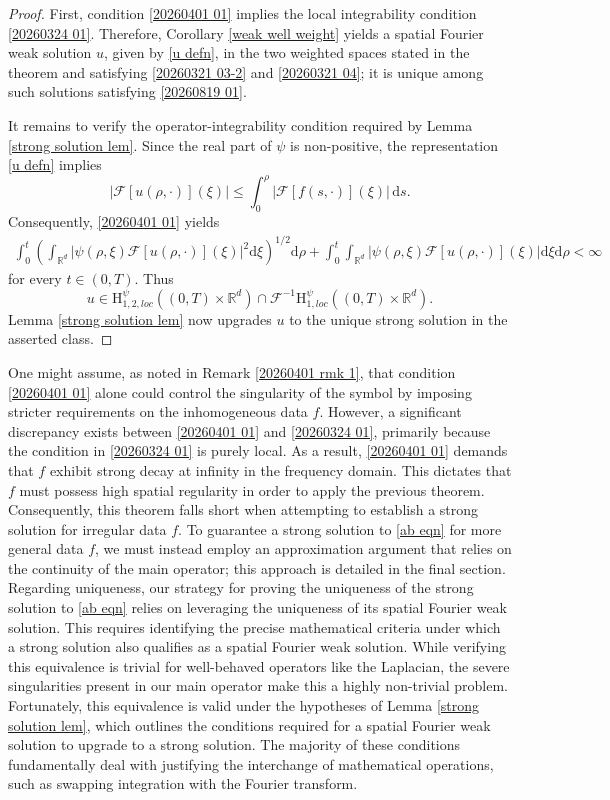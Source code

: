 \documentclass[11pt,reqno]{amsart}
\theoremstyle{definition}
\theoremstyle{remark}
\newcommand\bR{\mathbb{R}}
\newcommand\cF{\mathcal{F}}
\numberwithin{equation}{section}
\begin{document}
\begin{proof}
First, condition \eqref{20260401 01} implies the local integrability condition \eqref{20260324 01}. 
Therefore, Corollary \ref{weak well weight} yields a spatial Fourier weak solution $u$, given by \eqref{u defn}, in the two weighted spaces stated in the theorem and satisfying \eqref{20260321 03-2} and \eqref{20260321 04}; it is unique among such solutions satisfying \eqref{20260819 01}.

It remains to verify the operator-integrability condition required by Lemma \ref{strong solution lem}. Since the real part of $\psi$ is non-positive, the representation \eqref{u defn} implies
\[
|\cF[u(\rho,\cdot)](\xi)|
\leq \int_0^\rho |\cF[f(s,\cdot)](\xi)|\,\mathrm{d}s.
\]
Consequently, \eqref{20260401 01} yields
\begin{align*}
\int_0^t\left(\int_{\bR^d}|\psi(\rho,\xi)\cF[u(\rho,\cdot)](\xi)|^2\mathrm{d}\xi\right)^{1/2}\mathrm{d}\rho
+\int_0^t\int_{\bR^d}|\psi(\rho,\xi)\cF[u(\rho,\cdot)](\xi)|\mathrm{d}\xi\mathrm{d}\rho
<\infty
\end{align*}
for every $t\in(0,T)$. Thus
\[
u\in\mathrm{H}_{1,2,loc}^{\psi}\left( (0,T) \times \bR^d\right) \cap \cF^{-1}\mathrm{H}_{1,loc}^{\psi}\left( (0,T) \times \bR^d\right).
\]
Lemma \ref{strong solution lem} now upgrades $u$ to the unique strong solution in the asserted class.
\end{proof}


One might assume, as noted in Remark \ref{20260401 rmk 1}, that condition \eqref{20260401 01} alone could control the singularity of the symbol by imposing stricter requirements on the inhomogeneous data $f$. 
However, a significant discrepancy exists between \eqref{20260401 01} and \eqref{20260324 01}, primarily because the condition in \eqref{20260324 01} is purely local.
As a result, \eqref{20260401 01} demands that $f$ exhibit strong decay at infinity in the frequency domain. 
This dictates that $f$ must possess high spatial regularity in order to apply the previous theorem. 
Consequently, this theorem falls short when attempting to establish a strong solution for irregular data $f$. 
To guarantee a strong solution to \eqref{ab eqn} for more general data $f$, we must instead employ an approximation argument that relies on the continuity of the main operator; this approach is detailed in the final section.
Regarding uniqueness, our strategy for proving the uniqueness of the strong solution to \eqref{ab eqn} relies on leveraging the uniqueness of its spatial Fourier weak solution. 
This requires identifying the precise mathematical criteria under which a strong solution also qualifies as a spatial Fourier weak solution. 
While verifying this equivalence is trivial for well-behaved operators like the Laplacian, the severe singularities present in our main operator make this a highly non-trivial problem.
Fortunately, this equivalence is valid under the hypotheses of Lemma \ref{strong solution lem}, which outlines the conditions required for a spatial Fourier weak solution to upgrade to a strong solution. 
The majority of these conditions fundamentally deal with justifying the interchange of mathematical operations, such as swapping integration with the Fourier transform.
\end{document}
